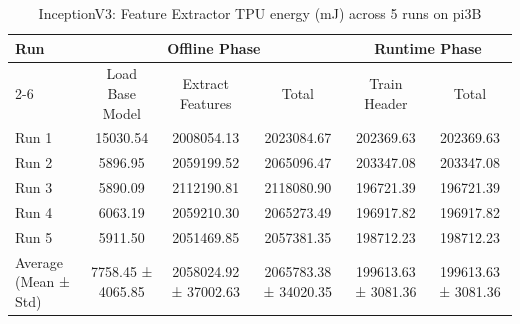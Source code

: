 \begin{table}[t]
\centering
\caption{InceptionV3: Feature Extractor TPU energy (mJ) across 5 runs on pi3B}
\label{tab:energy_inceptionv3_EdgeTPU_pi3B}
\begin{tabular}{lccccc}
\hline
\multirow{2}{*}{Run} & \multicolumn{3}{c}{Offline Phase} & \multicolumn{2}{c}{Runtime Phase} \\
\cline{2-6}
 & Load Base Model & Extract Features & Total & Train Header & Total \\
\hline
  Run 1                  & 15030.54       & 2008054.13     & 2023084.67     & 202369.63      & 202369.63      \\
  Run 2                  & 5896.95        & 2059199.52     & 2065096.47     & 203347.08      & 203347.08      \\
  Run 3                  & 5890.09        & 2112190.81     & 2118080.90     & 196721.39      & 196721.39      \\
  Run 4                  & 6063.19        & 2059210.30     & 2065273.49     & 196917.82      & 196917.82      \\
  Run 5                  & 5911.50        & 2051469.85     & 2057381.35     & 198712.23      & 198712.23      \\
\hline
  Average (Mean ± Std)   & 7758.45 ± 4065.85 & 2058024.92 ± 37002.63 & 2065783.38 ± 34020.35 & 199613.63 ± 3081.36 & 199613.63 ± 3081.36 \\
\hline
\end{tabular}
\end{table}
